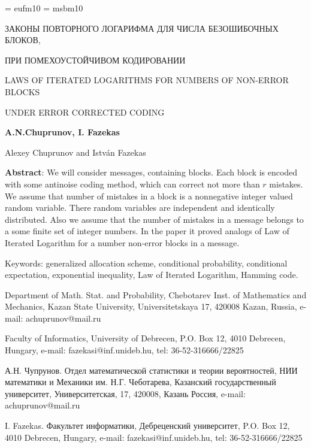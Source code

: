 \documentclass{article}
\begin{document}
\font\gothic = eufm10 \font\Bbb = msbm10


\centerline{ЗАКОНЫ ПОВТОРНОГО ЛОГАРИФМА ДЛЯ ЧИСЛА БЕЗОШИБОЧНЫХ
БЛОКОВ, }

\medskip

\centerline{ ПРИ ПОМЕХОУСТОЙЧИВОМ КОДИРОВАНИИ}

\bigskip



\centerline{LAWS OF ITERATED LOGARITHMS FOR NUMBERS OF NON-ERROR
BLOCKS }

\medskip

\centerline{ UNDER ERROR CORRECTED CODING}

\bigskip

\centerline{\bf A.N.Chuprunov, I. Fazekas}

\bigskip

\centerline{
  {\sc Alexey Chuprunov} and {\sc Istv\'an Fazekas}}


\medskip

{\small{\bf Abstract}: We will consider  messages,  containing
blocks. Each block is encoded with some antinoise coding method,
which can correct not more than $r$ mistakes. We assume that
number of mistakes  in a block  is a nonnegative integer valued
random variable. There random variables are independent  and
identically distributed. Also we assume  that the number of
mistakes in a message belongs to a some finite set of integer
numbers. In the paper it proved analogs of Law of Iterated
Logarithm for a number non-error blocks in a message.

}

\smallskip


Keywords: generalized allocation scheme, conditional probability,
conditional expectation, exponential inequality, Law of Iterated
Logarithm, Hamming code.



\bigskip
 Department of Math. Stat. and Probability, Chebotarev Inst. of
Mathematics and Mechanics, Kazan State University,
Universitetskaya 17, 420008 Kazan, Russia, e-mail:
achuprunov@mail.ru

\bigskip


Faculty of Informatics, University of Debrecen,  P.O. Box 12, 4010
Debrecen, Hungary, e-mail: fazekasi@inf.unideb.hu, tel:
36-52-316666/22825




\bigskip




А.Н. Чупрунов. Отдел математической статистики и теории
вероятностей, НИИ математики и Механики им. Н.Г. Чеботарева,
Казанский государственный университет, Университетская, 17,
420008, Казань Россия, e-mail: achuprunov@mail.ru

I. Fazekas. Факультет информатики, Дебреценский университет, P.O.
Box 12, 4010 Debrecen, Hungary, e-mail: fazekasi@inf.unideb.hu,
tel: 36-52-316666/22825
\end{document}
